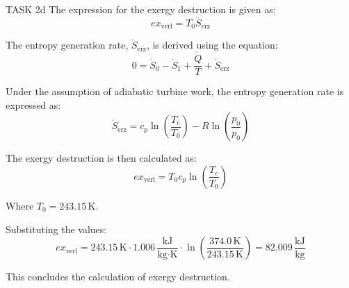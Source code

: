 TASK 2d  
The expression for the exergy destruction is given as:  
\[
ex_{\text{verl}} = T_0 \dot{S}_{\text{erz}}
\]  

The entropy generation rate, \( \dot{S}_{\text{erz}} \), is derived using the equation:  
\[
0 = \dot{S}_{0} - \dot{S}_{1} + \frac{\dot{Q}}{T} + \dot{S}_{\text{erz}}
\]  

Under the assumption of adiabatic turbine work, the entropy generation rate is expressed as:  
\[
\dot{S}_{\text{erz}} = c_p \ln \left( \frac{T_c}{T_0} \right) - R \ln \left( \frac{p_0}{p_0} \right)
\]  

The exergy destruction is then calculated as:  
\[
ex_{\text{verl}} = T_0 c_p \ln \left( \frac{T_c}{T_0} \right)
\]  

Where \( T_0 = 243.15 \, \text{K} \).  

Substituting the values:  
\[
ex_{\text{verl}} = 243.15 \, \text{K} \cdot 1.006 \, \frac{\text{kJ}}{\text{kg·K}} \cdot \ln \left( \frac{374.0 \, \text{K}}{243.15 \, \text{K}} \right) = 82.009 \, \frac{\text{kJ}}{\text{kg}}
\]  

This concludes the calculation of exergy destruction.